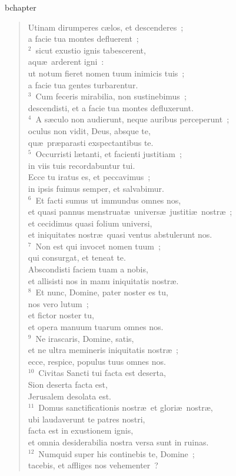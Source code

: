 bchapter\begin{verse}\vspace{-19pt}Utinam dirumperes c\ae los, et descenderes~;\\ a facie tua montes defluerent~;\\
${}^{2}$~sicut exustio ignis tabescerent,\\ aqu\ae\ arderent igni~:\\ ut notum fieret nomen tuum inimicis tuis~;\\ a facie tua gentes turbarentur.\\
${}^{3}$~Cum feceris mirabilia, non sustinebimus~;\\ descendisti, et a facie tua montes defluxerunt.\\
${}^{4}$~A s\ae culo non audierunt, neque auribus perceperunt~;\\ oculus non vidit, Deus, absque te,\\ qu\ae\ pr\ae parasti exspectantibus te.\\
${}^{5}$~Occurristi l\ae tanti, et facienti justitiam~;\\ in viis tuis recordabuntur tui.\\ Ecce tu iratus es, et peccavimus~;\\ in ipsis fuimus semper, et salvabimur.\\
${}^{6}$~Et facti sumus ut immundus omnes nos,\\ et quasi pannus menstruat\ae\ univers\ae\ justiti\ae\ nostr\ae~;\\ et cecidimus quasi folium universi,\\ et iniquitates nostr\ae\ quasi ventus abstulerunt nos.\\
${}^{7}$~Non est qui invocet nomen tuum~;\\ qui consurgat, et teneat te.\\ Abscondisti faciem tuam a nobis,\\ et allisisti nos in manu iniquitatis nostr\ae .\\
${}^{8}$~Et nunc, Domine, pater noster es tu,\\ nos vero lutum~;\\ et fictor noster tu,\\ et opera manuum tuarum omnes nos.\\
${}^{9}$~Ne irascaris, Domine, satis,\\ et ne ultra memineris iniquitatis nostr\ae~;\\ ecce, respice, populus tuus omnes nos.\\
${}^{10}$~Civitas Sancti tui facta est deserta,\\ Sion deserta facta est,\\ Jerusalem desolata est.\\
${}^{11}$~Domus sanctificationis nostr\ae\ et glori\ae\ nostr\ae ,\\ ubi laudaverunt te patres nostri,\\ facta est in exustionem ignis,\\ et omnia desiderabilia nostra versa sunt in ruinas.\\
${}^{12}$~Numquid super his continebis te, Domine~;\\ tacebis, et affliges nos vehementer~?\end{verse}


